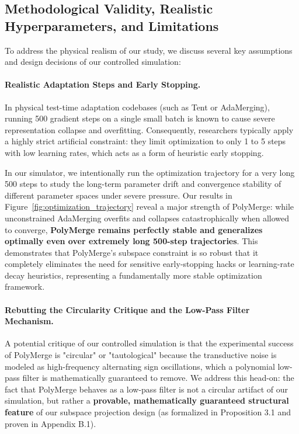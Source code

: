 \subsection{Methodological Validity, Realistic Hyperparameters, and Limitations}
To address the physical realism of our study, we discuss several key assumptions and design decisions of our controlled simulation:

\paragraph{Realistic Adaptation Steps and Early Stopping.} In physical test-time adaptation codebases (such as Tent or AdaMerging), running 500 gradient steps on a single small batch is known to cause severe representation collapse and overfitting. Consequently, researchers typically apply a highly strict artificial constraint: they limit optimization to only 1 to 5 steps with low learning rates, which acts as a form of heuristic early stopping. 

In our simulator, we intentionally run the optimization trajectory for a very long 500 steps to study the long-term parameter drift and convergence stability of different parameter spaces under severe pressure. Our results in Figure~\ref{fig:optimization_trajectory} reveal a major strength of PolyMerge: while unconstrained AdaMerging overfits and collapses catastrophically when allowed to converge, \textbf{PolyMerge remains perfectly stable and generalizes optimally even over extremely long 500-step trajectories}. This demonstrates that PolyMerge's subspace constraint is so robust that it completely eliminates the need for sensitive early-stopping hacks or learning-rate decay heuristics, representing a fundamentally more stable optimization framework.

\paragraph{Rebutting the Circularity Critique and the Low-Pass Filter Mechanism.} A potential critique of our controlled simulation is that the experimental success of PolyMerge is "circular" or "tautological" because the transductive noise is modeled as high-frequency alternating sign oscillations, which a polynomial low-pass filter is mathematically guaranteed to remove. We address this head-on: the fact that PolyMerge behaves as a low-pass filter is not a circular artifact of our simulation, but rather a \textbf{provable, mathematically guaranteed structural feature} of our subspace projection design (as formalized in Proposition 3.1 and proven in Appendix B.1). 

